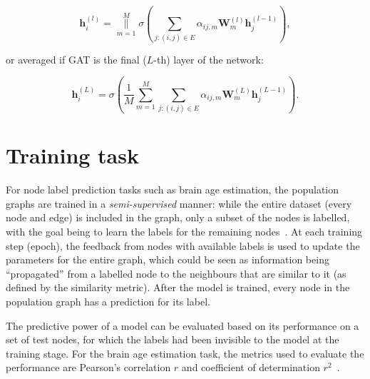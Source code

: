 \begin{equation}
    \mathbf{h}_i^{(l)} = \underset{m=1}{\overset{M}{\big\|}} \sigma\left(\sum\limits_{j: (i,j)\in E} \alpha_{ij, m}\mathbf{W}^{(l)}_m\mathbf{h}_j^{(l-1)}\right),
\end{equation}

or averaged if GAT is the final ($L$-th) layer of the network:

\begin{equation}
    \mathbf{h}_i^{(L)} = \sigma\left(\frac{1}{M}\sum\limits_{m=1}^M\sum\limits_{j: (i,j)\in E} \alpha_{ij, m}\mathbf{W}^{(L)}_m\mathbf{h}_j^{(L-1)}\right).
\end{equation}

\section{Training task}
\label{training-task}


For node label prediction tasks such as brain age estimation, the population graphs are trained in a \textit{semi-supervised} manner: while the entire dataset (every node and edge) is included in the graph, only a subset of the nodes is labelled, with the goal being to learn the labels for the remaining nodes~\cite{kipf2017semi}. At each training step (epoch), the feedback from nodes with available labels is used to update the parameters for the entire graph, which could be seen as information being ``propagated'' from a labelled node to the neighbours that are similar to it (as defined by the similarity metric). After the model is trained, every node in the population graph has a prediction for its label.

The predictive power of a model can be evaluated based on its performance on a set of test nodes, for which the labels had been invisible to the model at the training stage. For the brain age estimation task, the metrics used to evaluate the performance are Pearson's correlation $r$ and coefficient of determination $r^2$~\cite{niu2019improved}.



